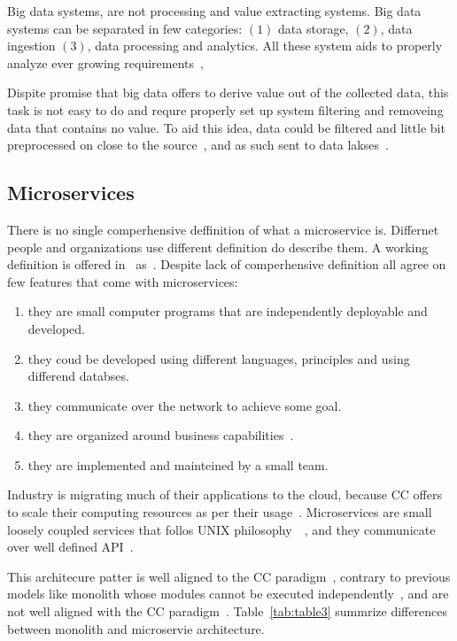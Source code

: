 Big data systems, are not processing and value extracting systems. Big data systems can be separated in few categories: $(1)$ data storage, $(2)$, data ingestion $(3)$, data processing and analytics. All these system aids to properly analyze ever growing requirements~\cite{RaoMBG19},

Dispite promise that big data offers to derive value out of the collected data, this task is not easy to do and requre properly set up system filtering and removeing data that contains no value. To aid this idea, data could be filtered and little bit preprocessed on close to the source~\cite{inproceedingsSimic1}, and as such sent to data lakses~\cite{MarynowskiSP15}.
%
%
\subsection{Microservices}\label{sec:microservices}
%
There is no single comperhensive deffinition of what a microservice is. Differnet people and organizations use different definition do describe them. A working definition is offered in~\cite{DragoniGLMMMS16} as~. Despite lack of comperhensive definition all agree on few features that come with microservices: 

\begin{enumerate}[start=1,label={(\bfseries \arabic*)}]
	\item they are small computer programs that are independently deployable and developed.
	\item they coud be developed using different languages, principles and using differend databses.
	\item they communicate over the network to achieve some goal.
	\item they are organized around business capabilities~\cite{PautassoZALJ17}.
	\item they are implemented and mainteined by a small team.
\end{enumerate}

Industry is migrating much of their applications to the cloud, because CC offers to scale their computing resources as per their usage~\cite{LiZJLZLGGS19}. Microservices are small loosely coupled services that follos UNIX philosophy~~\cite{krause2015microservices}, and they communicate over well defined API~\cite{DragoniGLMMMS16}.

This architecure patter is well aligned to the CC paradigm~\cite{LiZJLZLGGS19}, contrary to previous models like monolith whose modules cannot be executed independently~\cite{DragoniGLMMMS16, abs-1905-07997}, and are not well aligned with the CC paradigm~\cite{abs-1905-07997}. Table~\ref{tab:table3} summrize differences between monolith and microservie architecture.

